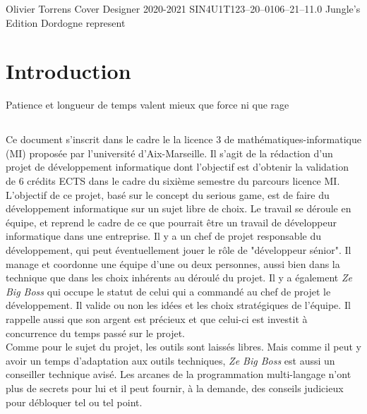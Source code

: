 \documentclass{tstextbook}
\begin{document}
\renewcommand{\contentsname}{Table des Matières}
       {Olivier Torrens}
       {Cover Designer}
       {2020-2021}
       {SIN4U1T}{123--20--0106--21--1}{1.0}
       {Jungle's Edition}
       {Dordogne represent}






\chapter{Introduction}

\begin{summary}
Patience et longueur de temps valent mieux que force ni que rage
\end{summary}
\section*{ }
Ce document s'inscrit dans le cadre le la licence 3 de mathématiques-informatique (MI) proposée par l'université d'Aix-Marseille. Il s'agit de la rédaction d'un projet de développement informatique dont l’objectif est d'obtenir la validation de 6 crédits ECTS dans le cadre du sixième semestre du parcours licence MI. \\

L'objectif de ce projet, basé sur le concept du serious game, est de faire du développement informatique sur un sujet libre de choix. Le travail se déroule en équipe, et reprend le cadre de ce que pourrait être un travail de développeur informatique dans une entreprise. Il y a un chef de projet responsable du développement, qui peut éventuellement jouer le rôle de "développeur sénior". Il manage et coordonne une équipe d'une ou deux personnes, aussi bien dans la technique que dans les choix inhérents au déroulé du projet.  Il y a également \emph{Ze Big Boss} qui occupe le statut de celui qui a commandé au chef de projet le développement. Il valide ou non les idées et les choix stratégiques de l'équipe. Il rappelle aussi que son argent est précieux et que celui-ci est investit à concurrence du temps passé sur le projet. \\

Comme pour le sujet du projet, les outils sont laissés libres. Mais comme il peut y avoir un temps d'adaptation aux outils techniques, \emph{Ze Big Boss}  est aussi un conseiller technique avisé. Les arcanes de la programmation multi-langage n'ont plus de secrets pour lui et il peut fournir, à la demande, des conseils judicieux pour débloquer tel ou tel point. \\
\end{document}
